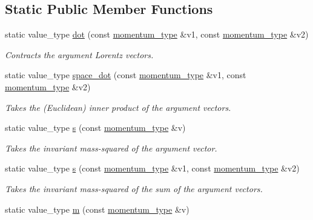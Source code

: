 \subsection*{Static Public Member Functions}
\begin{DoxyCompactItemize}
\item 
\hypertarget{a00442_a85e7dff8f86c926703770d613d50b994}{static value\-\_\-type \hyperlink{a00442_a85e7dff8f86c926703770d613d50b994}{dot} (const \hyperlink{a00559}{momentum\-\_\-type} \&v1, const \hyperlink{a00559}{momentum\-\_\-type} \&v2)}\label{a00442_a85e7dff8f86c926703770d613d50b994}

\begin{DoxyCompactList}\small\item\em Contracts the argument Lorentz vectors. \end{DoxyCompactList}\item 
\hypertarget{a00442_ab5e639edbafd4b4d3e57e935d9b0bd5e}{static value\-\_\-type \hyperlink{a00442_ab5e639edbafd4b4d3e57e935d9b0bd5e}{space\-\_\-dot} (const \hyperlink{a00559}{momentum\-\_\-type} \&v1, const \hyperlink{a00559}{momentum\-\_\-type} \&v2)}\label{a00442_ab5e639edbafd4b4d3e57e935d9b0bd5e}

\begin{DoxyCompactList}\small\item\em Takes the (Euclidean) inner product of the argument vectors. \end{DoxyCompactList}\item 
\hypertarget{a00442_a001116beb90eeda48f7cb668f67c8995}{static value\-\_\-type \hyperlink{a00442_a001116beb90eeda48f7cb668f67c8995}{s} (const \hyperlink{a00559}{momentum\-\_\-type} \&v)}\label{a00442_a001116beb90eeda48f7cb668f67c8995}

\begin{DoxyCompactList}\small\item\em Takes the invariant mass-\/squared of the argument vector. \end{DoxyCompactList}\item 
\hypertarget{a00442_a9d16152b17353661ccb6e1f03047da8e}{static value\-\_\-type \hyperlink{a00442_a9d16152b17353661ccb6e1f03047da8e}{s} (const \hyperlink{a00559}{momentum\-\_\-type} \&v1, const \hyperlink{a00559}{momentum\-\_\-type} \&v2)}\label{a00442_a9d16152b17353661ccb6e1f03047da8e}

\begin{DoxyCompactList}\small\item\em Takes the invariant mass-\/squared of the sum of the argument vectors. \end{DoxyCompactList}\item 
\hypertarget{a00442_a3a9390d5b0f36b7778161963c43843b0}{static value\-\_\-type \hyperlink{a00442_a3a9390d5b0f36b7778161963c43843b0}{m} (const \hyperlink{a00559}{momentum\-\_\-type} \&v)}\label{a00442_a3a9390d5b0f36b7778161963c43843b0}


\end{DoxyCompactItemize}
